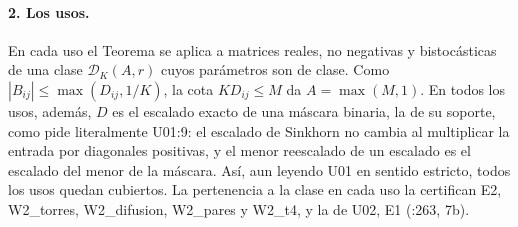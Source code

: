 \paragraph{2. Los usos.} En cada uso el Teorema se aplica a matrices reales, no negativas y
bistocásticas de una clase $\mathcal D_K(A,r)$ cuyos parámetros son de clase. Como
$|B_{ij}|\le\max(D_{ij},1/K)$, la cota $KD_{ij}\le M$ da $A=\max(M,1)$. En todos los usos, además,
$D$ es el escalado exacto de una máscara binaria, la de su soporte, como pide literalmente U01:9:
el escalado de Sinkhorn no cambia al multiplicar la entrada por diagonales positivas, y el menor
reescalado de un escalado es el escalado del menor de la máscara. Así, aun leyendo U01 en sentido
estricto, todos los usos quedan cubiertos. La pertenencia a la clase en cada uso la certifican E2,
W2\_torres, W2\_difusion, W2\_pares y W2\_t4, y la de U02, E1 (:263, 7b).
